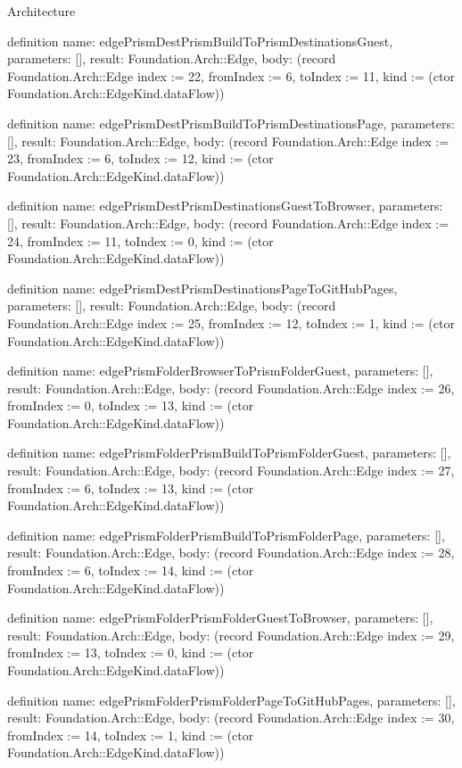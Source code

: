 \begin{lexlean}{Architecture}
\begin{semanticmodule}
definition{
  name: edgePrismDestPrismBuildToPrismDestinationsGuest,
  parameters: [],
  result: Foundation.Arch::Edge,
  body: (record Foundation.Arch::Edge {index := 22, fromIndex := 6, toIndex := 11, kind := (ctor Foundation.Arch::EdgeKind.dataFlow)})
}

definition{
  name: edgePrismDestPrismBuildToPrismDestinationsPage,
  parameters: [],
  result: Foundation.Arch::Edge,
  body: (record Foundation.Arch::Edge {index := 23, fromIndex := 6, toIndex := 12, kind := (ctor Foundation.Arch::EdgeKind.dataFlow)})
}

definition{
  name: edgePrismDestPrismDestinationsGuestToBrowser,
  parameters: [],
  result: Foundation.Arch::Edge,
  body: (record Foundation.Arch::Edge {index := 24, fromIndex := 11, toIndex := 0, kind := (ctor Foundation.Arch::EdgeKind.dataFlow)})
}

definition{
  name: edgePrismDestPrismDestinationsPageToGitHubPages,
  parameters: [],
  result: Foundation.Arch::Edge,
  body: (record Foundation.Arch::Edge {index := 25, fromIndex := 12, toIndex := 1, kind := (ctor Foundation.Arch::EdgeKind.dataFlow)})
}

definition{
  name: edgePrismFolderBrowserToPrismFolderGuest,
  parameters: [],
  result: Foundation.Arch::Edge,
  body: (record Foundation.Arch::Edge {index := 26, fromIndex := 0, toIndex := 13, kind := (ctor Foundation.Arch::EdgeKind.dataFlow)})
}

definition{
  name: edgePrismFolderPrismBuildToPrismFolderGuest,
  parameters: [],
  result: Foundation.Arch::Edge,
  body: (record Foundation.Arch::Edge {index := 27, fromIndex := 6, toIndex := 13, kind := (ctor Foundation.Arch::EdgeKind.dataFlow)})
}

definition{
  name: edgePrismFolderPrismBuildToPrismFolderPage,
  parameters: [],
  result: Foundation.Arch::Edge,
  body: (record Foundation.Arch::Edge {index := 28, fromIndex := 6, toIndex := 14, kind := (ctor Foundation.Arch::EdgeKind.dataFlow)})
}

definition{
  name: edgePrismFolderPrismFolderGuestToBrowser,
  parameters: [],
  result: Foundation.Arch::Edge,
  body: (record Foundation.Arch::Edge {index := 29, fromIndex := 13, toIndex := 0, kind := (ctor Foundation.Arch::EdgeKind.dataFlow)})
}

definition{
  name: edgePrismFolderPrismFolderPageToGitHubPages,
  parameters: [],
  result: Foundation.Arch::Edge,
  body: (record Foundation.Arch::Edge {index := 30, fromIndex := 14, toIndex := 1, kind := (ctor Foundation.Arch::EdgeKind.dataFlow)})
}


\end{semanticmodule}
\end{lexlean}
